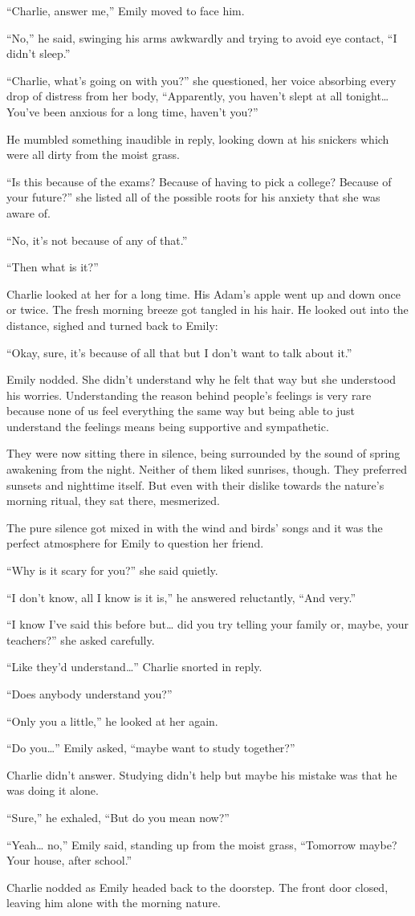 “Charlie, answer me,” Emily moved to face him.

“No,” he said, swinging his arms awkwardly and trying to avoid eye contact, “I didn’t sleep.”

“Charlie, what’s going on with you?” she questioned, her voice absorbing every drop of distress from her body, “Apparently, you haven’t slept at all tonight… You’ve been anxious for a long time, haven’t you?”

He mumbled something inaudible in reply, looking down at his snickers which were all dirty from the moist grass.

“Is this because of the exams? Because of having to pick a college? Because of your future?” she listed all of the possible roots for his anxiety that she was aware of.

“No, it’s not because of any of that.”

“Then what is it?”

Charlie looked at her for a long time. His Adam’s apple went up and down once or twice. The fresh morning breeze got tangled in his hair. He looked out into the distance, sighed and turned back to Emily:

“Okay, sure, it’s because of all that but I don’t want to talk about it.”

Emily nodded. She didn’t understand why he felt that way but she understood his worries. Understanding the reason behind people’s feelings is very rare because none of us feel everything the same way but being able to just understand the feelings means being supportive and sympathetic.

They were now sitting there in silence, being surrounded by the sound of spring awakening from the night. Neither of them liked sunrises, though. They preferred sunsets and nighttime itself. But even with their dislike towards the nature’s morning ritual, they sat there, mesmerized.

The pure silence got mixed in with the wind and birds’ songs and it was the perfect atmosphere for Emily to question her friend.

“Why is it scary for you?” she said quietly.

“I don’t know, all I know is it is,” he answered reluctantly, “And very.”

“I know I’ve said this before but… did you try telling your family or, maybe, your teachers?” she asked carefully.

“Like they’d understand…” Charlie snorted in reply.

“Does anybody understand you?”

“Only you a little,” he looked at her again.

“Do you…” Emily asked, “maybe want to study together?”

Charlie didn’t answer. Studying didn’t help but maybe his mistake was that he was doing it alone.

“Sure,” he exhaled, “But do you mean now?”

“Yeah… no,” Emily said, standing up from the moist grass, “Tomorrow maybe? Your house, after school.”

Charlie nodded as Emily headed back to the doorstep. The front door closed, leaving him alone with the morning nature.